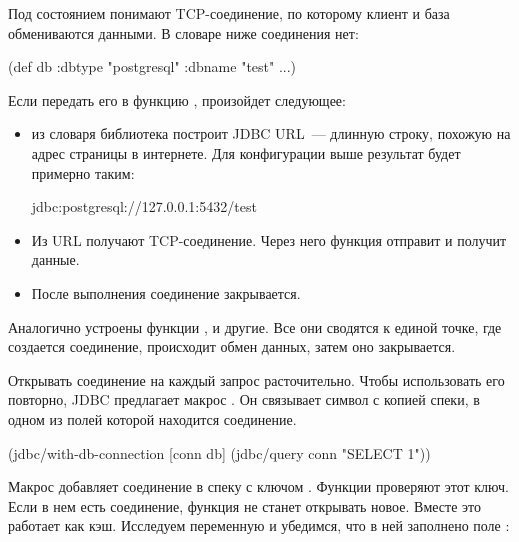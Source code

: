 Под состоянием понимают TCP-соединение, по которому клиент и база обмениваются данными. В словаре ниже соединения нет:

\begin{english}
  \begin{clojure}
(def db {:dbtype "postgresql"
         :dbname "test"
         ...})
  \end{clojure}
\end{english}

Если передать его в функцию , произойдет следующее:

\begin{itemize}

\item
  из словаря библиотека построит JDBC URL~--- длинную строку, похожую на адрес страницы в интернете. Для конфигурации выше результат будет примерно таким:

\begin{english}
  \begin{text}
jdbc:postgresql://127.0.0.1:5432/test
  \end{text}
\end{english}

\item
  Из URL получают TCP-соединение. Через него функция  отправит и получит данные.

\item
  После выполнения  соединение закрывается.

\end{itemize}

Аналогично устроены функции ,  и другие. Все они сводятся к единой точке, где создается соединение, происходит обмен данных, затем оно закрывается.

Открывать соединение на каждый запрос расточительно. Чтобы использовать его повторно, JDBC предлагает макрос . Он связывает символ с копией спеки, в одном из полей которой находится соединение.

\begin{english}
  \begin{clojure}
(jdbc/with-db-connection [conn db]
  (jdbc/query conn "SELECT 1"))
  \end{clojure}
\end{english}

Макрос добавляет соединение в спеку с ключом . Функции проверяют этот ключ. Если в нем есть соединение, функция не станет открывать новое. Вместе это работает как кэш. Исследуем переменную  и убедимся, что в ней заполнено поле  :

